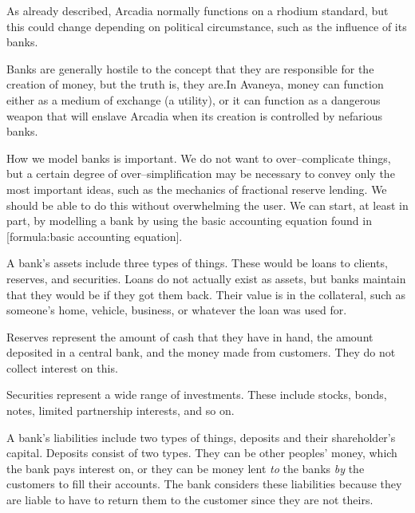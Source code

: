 
As already described, Arcadia normally functions on a rhodium standard, but this could change depending on political circumstance, such as the influence of its banks.

Banks are generally hostile to the concept that they are responsible for the creation of money, but the truth is, they are. In Avaneya, money can function either as a medium of exchange (a utility), or it can function as a dangerous weapon that will enslave Arcadia when its creation is controlled by nefarious banks.

How we model banks is important. We do not want to over--complicate things, but a certain degree of over--simplification may be necessary to convey only the most important ideas, such as the mechanics of fractional reserve lending. We should be able to do this without overwhelming the user. We can start, at least in part, by modelling a bank by using the basic accounting equation found in [formula:basic accounting equation].

\crlf
{}
\startformula
{}
\stopformula
\crlf

A bank's assets include three types of things. These would be loans to clients, reserves, and securities. Loans do not actually exist as assets, but banks maintain that they would be if they got them back. Their value is in the collateral, such as someone's home, vehicle, business, or whatever the loan was used for.

Reserves represent the amount of cash that they have in hand, the amount deposited in a central bank, and the money made from customers. They do not collect interest on this. 

Securities represent a wide range of investments. These include stocks, bonds, notes, limited partnership interests, and so on.

A bank's liabilities include two types of things, deposits and their shareholder's capital. Deposits consist of two types. They can be other peoples' money, which the bank pays interest on, or they can be money lent {\it to} the banks {\it by} the customers to fill their accounts. The bank considers these liabilities because they are liable to have to return them to the customer since they are not theirs.

